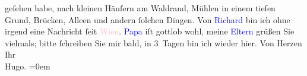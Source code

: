                geſehen habe, nach kleinen Häuſern am {\pb}Waldrand, Mühlen in einem tiefen
               Grund, Brücken, Alleen und andern ſolchen Dingen. Von \textcolor{blue}{Richard}{}\ledrightnote{\textcolor{blue}{Richard Beer-Hofmann}} bin ich ohne irgend eine Nachricht ſeit \textcolor{pink}{Wien}{}\ledrightnote{\textcolor{pink}{Wien}}.\pend
           \pstart
           \textcolor{blue}{Papa}{} iſt gottlob wohl, meine
                  \textcolor{blue}{Eltern}{} grüßen Sie
               vielmals; bitte ſchreiben Sie mir bald, in 3 Tagen bin ich wieder hier.\pend
           \pstart
           Von Herzen Ihr{\\[\baselineskip]}\spacefill\mbox{Hugo.}\pend
           \leftskip=0em{}\endnumbering{}  
      
